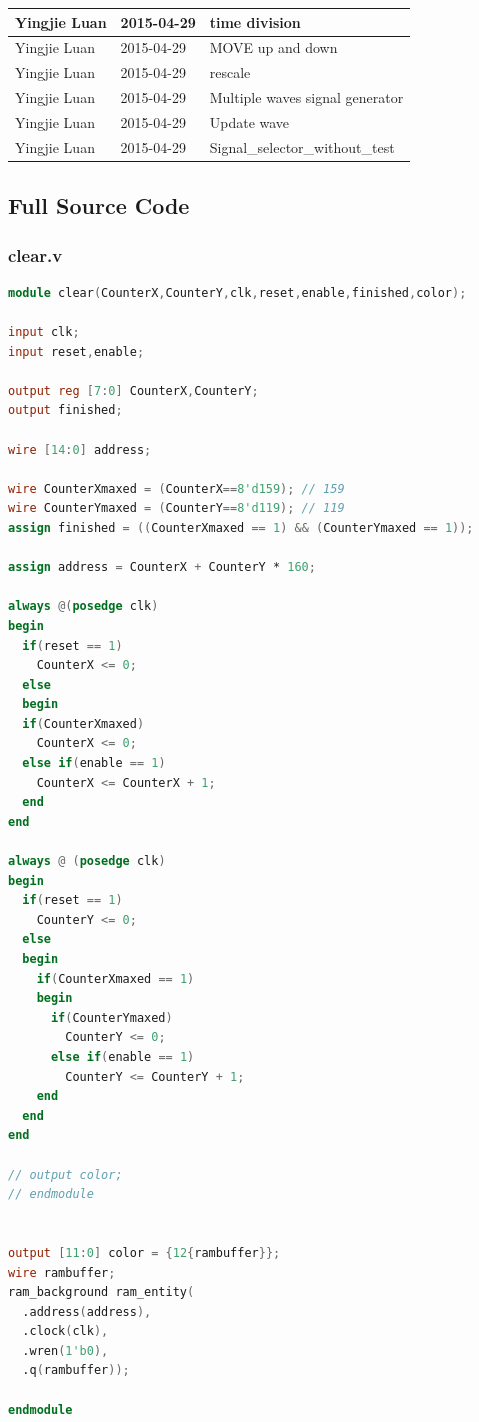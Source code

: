 \documentclass[11pt]{scrartcl}
\begin{document}
\begin{longtable}{@{\extracolsep{\fill}}lll@{}}
Yingjie Luan & 2015-04-29 & time division \\ \hline
Yingjie Luan & 2015-04-29 & MOVE up and down \\ \hline
Yingjie Luan & 2015-04-29 & rescale \\ \hline
Yingjie Luan & 2015-04-29 & Multiple waves signal generator \\ \hline
Yingjie Luan & 2015-04-29 & Update wave \\ \hline
Yingjie Luan & 2015-04-29 & Signal\_selector\_without\_test \\ \hline\end{longtable}

\subsection{Full Source Code}
\subsubsection{clear.v}
\begin{lstlisting}[language=Verilog]
module clear(CounterX,CounterY,clk,reset,enable,finished,color);

input clk;
input reset,enable;

output reg [7:0] CounterX,CounterY;
output finished;

wire [14:0] address;

wire CounterXmaxed = (CounterX==8'd159); // 159
wire CounterYmaxed = (CounterY==8'd119); // 119
assign finished = ((CounterXmaxed == 1) && (CounterYmaxed == 1));

assign address = CounterX + CounterY * 160;

always @(posedge clk)
begin
  if(reset == 1)
    CounterX <= 0;
  else
  begin
  if(CounterXmaxed)
    CounterX <= 0;
  else if(enable == 1)
    CounterX <= CounterX + 1;
  end
end

always @ (posedge clk)
begin
  if(reset == 1)
    CounterY <= 0;
  else
  begin
    if(CounterXmaxed == 1)
    begin
      if(CounterYmaxed)
        CounterY <= 0;
      else if(enable == 1)
        CounterY <= CounterY + 1;
    end
  end
end

// output color;
// endmodule


output [11:0] color = {12{rambuffer}};
wire rambuffer;
ram_background ram_entity(
  .address(address),
  .clock(clk),
  .wren(1'b0),
  .q(rambuffer));

endmodule
\end{lstlisting}
\end{document}
